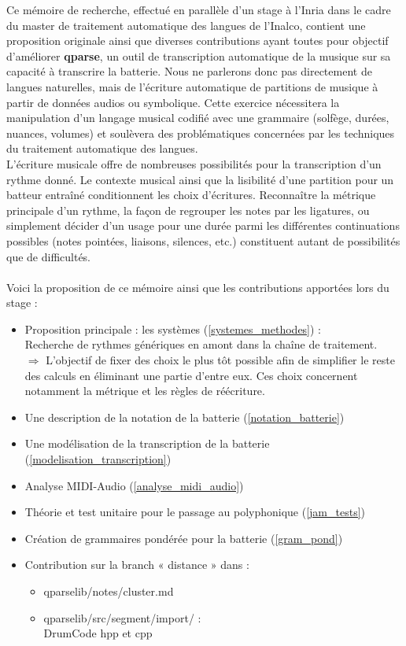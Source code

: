 Ce mémoire de recherche, effectué en parallèle d’un stage à l’Inria dans le cadre du master de traitement automatique des langues de l’Inalco, contient une proposition originale ainsi que diverses contributions ayant toutes pour objectif d’améliorer \textbf{qparse}, un outil de transcription automatique de la musique sur sa capacité à transcrire la batterie. Nous ne parlerons donc pas directement de langues naturelles, mais de l’écriture automatique de partitions de musique à partir de données audios ou symbolique. Cette exercice nécessitera la manipulation d’un langage musical codifié avec une grammaire (solfège, durées, nuances, volumes) et soulèvera des problématiques concernées par les techniques du traitement automatique des langues.\\
L’écriture musicale offre de nombreuses possibilités pour la transcription d’un rythme donné. Le contexte musical ainsi que la lisibilité d’une partition pour un batteur entraîné conditionnent les choix d’écritures. Reconnaître la métrique principale d’un rythme, la façon de regrouper les notes par les ligatures, ou simplement décider d’un usage pour une durée parmi les différentes continuations possibles (notes pointées, liaisons, silences, etc.) constituent autant de possibilités que de difficultés.\\\\
Voici la proposition de ce mémoire ainsi que les contributions apportées lors du stage :
\begin{itemize}
	\item Proposition principale : les systèmes (\ref{systemes_methodes}) :\\
	Recherche de rythmes génériques en amont dans la chaîne de traitement.\\
	$\Rightarrow$ L’objectif de fixer des choix le plus tôt possible afin de simplifier le reste des calculs en éliminant une partie d’entre eux. Ces choix concernent notamment la métrique et les règles de réécriture.
	\item Une description de la notation de la batterie (\ref{notation_batterie})
	\item Une modélisation de la transcription de la batterie (\ref{modelisation_transcription})
	\item Analyse MIDI-Audio (\ref{analyse_midi_audio})
	\item Théorie et test unitaire pour le passage au polyphonique (\ref{jam_tests})
	\item Création de grammaires pondérée pour la batterie (\ref{gram_pond})
	\item Contribution sur la branch « distance » dans :
	\begin{itemize}
		\item qparselib/notes/cluster.md
		\item qparselib/src/segment/import/ :\\
		DrumCode hpp et cpp\\
	\end{itemize}
\end{itemize}
 
